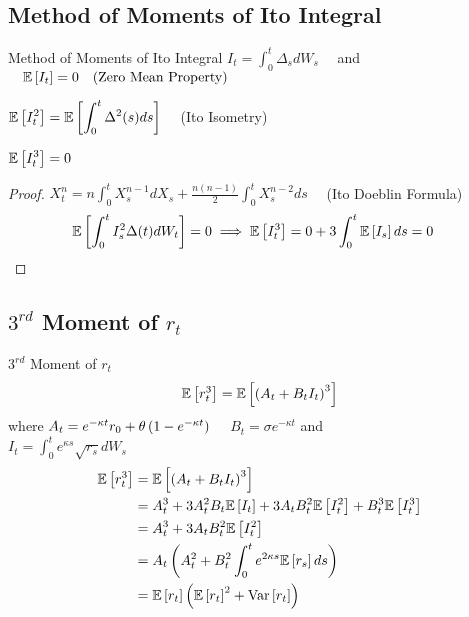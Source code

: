 \subsection{Method of Moments of Ito Integral}
\begin{frame}{Method of Moments of Ito Integral}
	\( \displaystyle I_t = \int_0^t \Delta_s dW_s \quad \) and
	\( \quad \mathbb{E} \left[ I_t \right] = 0 \quad (\text{Zero Mean Property}) \)

	\( \displaystyle \mathbb{E} \left[ I_t^2 \right] = \mathbb{E} \left[ \int_0^t \Delta^2(s) ds \right] \quad \)
	(Ito Isometry)

	\begin{proposition}
		\( \displaystyle \mathbb{E} \left[ I_t^3 \right] = 0 \)
	\end{proposition}

	\begin{proof}%
		\( \displaystyle X_t^n = n \int_0^t X_s^{n-1} dX_s
		+ \frac{n(n-1)}{2} \int_0^t X_s^{n-2} ds \quad \)
		(Ito Doeblin Formula)
		\begin{align*}
			\mathbb{E} \left[ \int_0^t I_s^2 \Delta(t) dW_t \right] &= 0
			\implies \mathbb{E} \left[ I_t^3 \right] = 0 + 3 \int_0^t \mathbb{E} \left[ I_s \right] ds = 0
		\end{align*}
	\end{proof}
\end{frame}

\subsection{\( 3^{rd} \) Moment of \( r_t \)}
\begin{frame}{\( 3^{rd} \) Moment of \( r_t \)}
	\[ \mathbb{E} \left[ r_t^3 \right] = \mathbb{E} \left[ \left( A_t + B_t I_t \right)^3 \right] \] where
	\( A_t = e^{-\kappa t} r_0 + \theta \left( 1 - e^{-\kappa t} \right) \quad \)
	\( B_t = \sigma e^{-\kappa t} \) and \\
	\( \displaystyle I_t = \int_0^t e^{\kappa s} \sqrt{r_s} dW_s \quad \)
	\begin{align*}
		\mathbb{E} \left[ r_t^3 \right] &= \mathbb{E} \left[ \left( A_t + B_t I_t \right)^3 \right] \\
		&= A_t^3 + 3A_t^2 B_t\mathbb{E} \left[ I_t \right] + 3A_t B_t^2\mathbb{E} \left[ I_t^2 \right]
			+ B_t^3\mathbb{E} \left[ I_t^3 \right] \\
		&= A_t^3 + 3A_t B_t^2\mathbb{E} \left[ I_t^2 \right] \\
		&= A_t \left( A_t^2 + B_t^2 \int_0^t e^{2\kappa s} \mathbb{E} \left[ r_s \right] ds  \right) \\
		&= \mathbb{E} \left[ r_t \right] \left( \mathbb{E} \left[ r_t \right]^2 + \text{Var} \left[ r_t \right] \right)
	\end{align*}
\end{frame}
